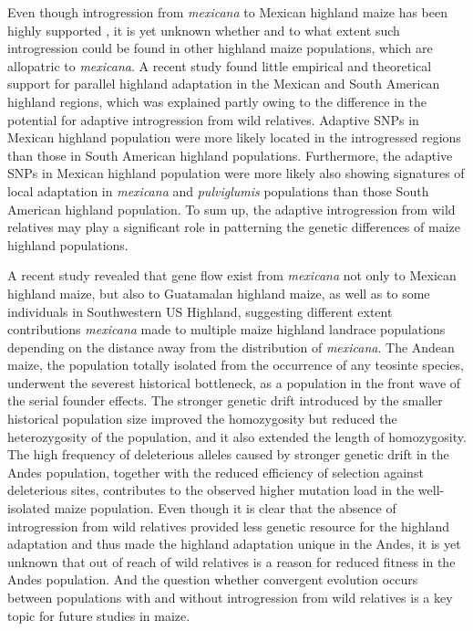 \documentclass[11pt]{article}
\begin{document}
Even though introgression from \emph{mexicana} to Mexican highland maize has been highly supported \cite{hufford2013}, it is yet unknown whether and to what extent such introgression could be found in other highland maize populations, which are allopatric to \emph{mexicana}. 
A recent study \cite{Takuno2015} found little empirical and theoretical support for parallel highland adaptation in the Mexican and South American highland regions, which was explained partly owing to the difference in the potential for adaptive introgression from wild relatives.
Adaptive SNPs in Mexican highland population were more likely located in the introgressed regions than those in South American highland populations.
Furthermore, the adaptive SNPs in Mexican highland population were more likely also showing signatures of local adaptation in \emph{mexicana} and \emph {pulviglumis} populations than those South American highland population.
To sum up, the adaptive introgression from wild relatives may play a significant role in patterning the genetic differences of maize highland populations.

A recent study \cite{Wang2015manuscript} revealed that gene flow exist from \emph{mexicana} not only to Mexican highland maize, but also to Guatamalan highland maize, as well as to some individuals in Southwestern US Highland, suggesting different extent contributions \emph{mexicana} made to multiple maize highland landrace populations depending on the distance away from the distribution of \emph{mexicana}. 
The Andean maize, the population totally isolated from the occurrence of any teosinte species, underwent the severest historical bottleneck, as a population in the front wave of the serial founder effects. 
The stronger genetic drift introduced by the smaller historical population size improved the homozygosity but reduced the heterozygosity of the population, and it also extended the length of homozygosity.
The high frequency of deleterious alleles caused by stronger genetic drift in the Andes population, together with the reduced efficiency of selection against deleterious sites, contributes to the observed higher mutation load in the well-isolated maize population. 
Even though it is clear that the absence of introgression from wild relatives provided less genetic resource for the highland adaptation and thus made the highland adaptation unique in the Andes, it is yet unknown that out of reach of wild relatives is a reason for reduced fitness in the Andes population.
And the question whether convergent evolution occurs between populations with and without introgression from wild relatives is a key topic for future studies in maize.
 
\end{document}

